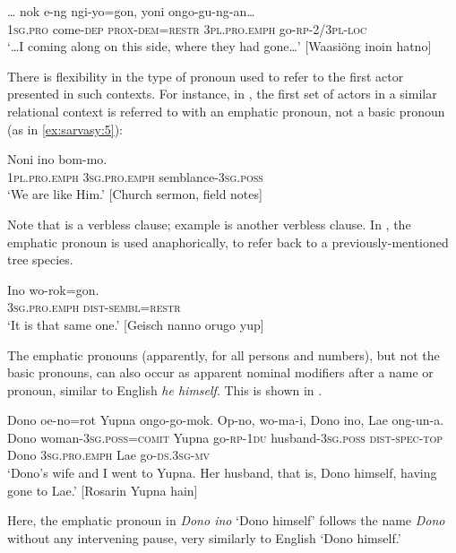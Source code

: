 \documentclass[output=paper,colorlinks,citecolor=brown]{langscibook}
\begin{document}
\ea%
    \label{ex:sarvasy:5}
    \gll    …  nok     e-ng    ngi-yo=gon,    yoni  ongo-gu-ng-an…\\
            {} \textsc{1sg.pro} come-\textsc{dep} \textsc{prox-dem=restr}  \textsc{3pl.pro.emph} go-\textsc{rp-2/3pl-loc}\\
    \glt    ‘…I coming along on this side, where they had gone…’ [Waasiöng inoin hatno]
\z

There is flexibility in the type of pronoun used to refer to the first actor presented in such contexts. For instance, in , the first set of actors in a similar relational context is referred to with an emphatic pronoun, not a basic pronoun (as in \ref{ex:sarvasy:5}):

\ea%
    \label{ex:sarvasy:6}
    \gll    Noni     ino     bom-mo.\\
            \textsc{1pl.pro.emph}  \textsc{3sg.pro.emph}  semblance-\textsc{3sg.poss}\\
    \glt    ‘We are like Him.’ [Church sermon, field notes]
\z

Note that  is a verbless clause; example  is another verbless clause. In , the emphatic pronoun is used anaphorically, to refer back to a previously-mentioned tree species.

\ea%
    \label{ex:sarvasy:7}
    \gll    Ino    wo-rok=gon.\\
            \textsc{3sg.pro.emph}  \textsc{dist-sembl=restr}\\
    \glt    ‘It is that same one.’ [Geisch nanno orugo yup]
\z

The emphatic pronouns (apparently, for all persons and numbers), but not the basic pronouns, can also occur as apparent nominal modifiers after a name or pronoun, similar to English \textit{he himself}. This is shown in .

\ea%
    \label{ex:sarvasy:8}
    \gll    Dono  oe-no=rot Yupna ongo-go-mok. Op-no, wo-ma-i, Dono ino, Lae ong-un-a.\\
            Dono  woman-\textsc{3sg.poss=comit}  Yupna  go-\textsc{rp-1du} husband-\textsc{3sg.poss} \textsc{dist-spec-top} Dono \textsc{3sg.pro.emph} Lae go-\textsc{ds.3sg-mv}\\
    \glt    ‘Dono’s wife and I went to Yupna. Her husband, that is, Dono himself, having gone to Lae.’ [Rosarin Yupna hain]
\z

Here, the emphatic pronoun in \textit{Dono ino} ‘Dono himself’ follows the name \textit{Dono} without any intervening pause, very similarly to English ‘Dono himself.’ 
\end{document}
